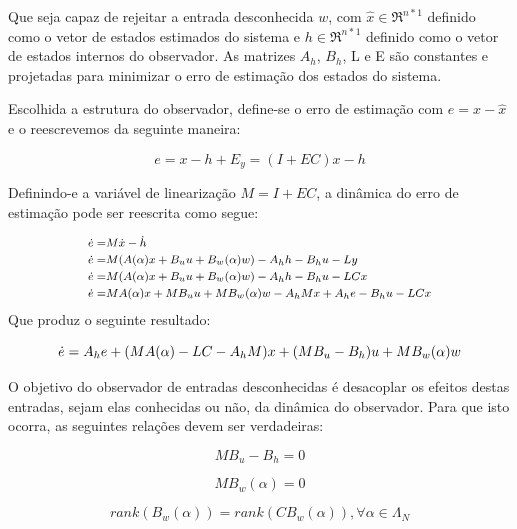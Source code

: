 Que seja capaz de rejeitar a entrada desconhecida $w$, com $\hat{x} \in \Re^{n*1}$ definido como o vetor de estados estimados do sistema e $h \in \Re^{n*1}$ definido como o vetor de estados internos do observador. As matrizes $A_h$, $B_h$, L e E são constantes e projetadas para minimizar o erro de estimação dos estados do sistema.

Escolhida a estrutura do observador, define-se o erro de estimação com $e=x-\hat{x}$ e o reescrevemos da seguinte maneira:

\begin{equation}
  e=x-h+E_y = (I+EC)x-h
\end{equation}

Definindo-e a variável de linearização $M=I+EC$, a dinâmica do erro de estimação pode ser reescrita como segue:

\begin{equation} \footnotesize
  \begin{split}
    \dot{e}=&M\dot{x}-\dot{h}\\
    \dot{e}=&M(A(\alpha)x+B_uu+B_w(\alpha)w)-A_hh-B_hu-Ly\\
    \dot{e}=&M(A(\alpha)x+B_uu+B_w(\alpha)w)-A_hh-B_hu-LCx\\
    \dot{e}=&MA(\alpha)x+MB_uu+MB_w(\alpha)w-A_hMx+A_he-B_hu-LCx\\
  \end{split}  
\end{equation}
\normalsize
Que produz o seguinte resultado:

\begin{equation} \footnotesize
  \dot{e}=A_he+(MA(\alpha)-LC-A_hM)x+(MB_u-B_h)u+MB_w(\alpha)w
\end{equation}

O objetivo do observador de entradas desconhecidas é desacoplar os efeitos destas entradas, sejam elas conhecidas ou não, da dinâmica do observador. Para que isto ocorra, as seguintes relações devem ser verdadeiras:

\begin{equation} \label{eq:cond1UIO}
  MB_u-B_h=0  
\end{equation}

\begin{equation} \label{eq:cond2UIO}
  MB_w(\alpha)=0
\end{equation}

\begin{lema} \label{eq:lema1UIO}
  \begin{equation} 
    rank(B_w(\alpha))=rank(CB_w(\alpha)), \forall\alpha \in \Lambda_N
  \end{equation}  
\end{lema}

